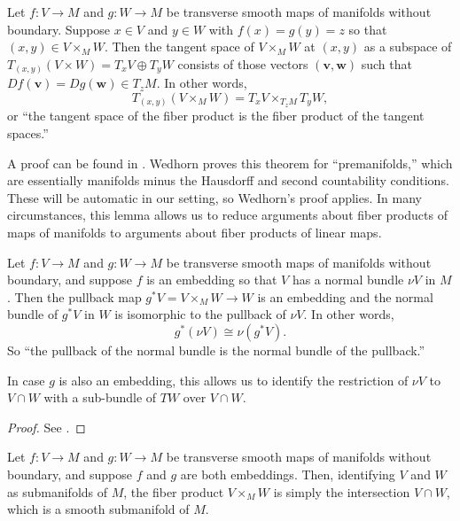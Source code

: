 \begin{remark}
\begin{lemma}\label{L: tangent of pullbacks}
	Let $f \colon V\to M$ and $g \colon W\to M$ be transverse smooth maps of manifolds without boundary.
	Suppose $x\in V$ and $y\in W$ with $f(x)=g(y)=z$ so that $(x,y)\in V\times_MW$.
	Then the tangent space of $V\times_MW$ at $(x,y)$ as a subspace of $T_{(x,y)}(V\times W)= T_xV\oplus T_yW$ consists of those vectors $(\mathbf v,\mathbf w)$ such that $Df(\mathbf v)=Dg(\mathbf w)\in T_zM$.
	In other words,
	$$T_{(x,y)}(V\times_MW)=T_xV\times_{T_zM}T_yW,$$
	or ``the tangent space of the fiber product is the fiber product of the tangent spaces.''
\end{lemma}

A proof can be found in \cite[Theorem 5.47]{Wed16}.
Wedhorn proves this theorem for ``premanifolds,'' which are essentially manifolds minus the Hausdorff and second countability conditions.
These will be automatic in our setting, so Wedhorn's proof applies.
In many circumstances, this lemma allows us to reduce arguments about fiber products of maps of manifolds to arguments about fiber products of linear maps.

\begin{lemma}\label{L: normal pullback}
	Let $f \colon V\to M$ and $g \colon W\to M$ be transverse smooth maps of manifolds without boundary, and suppose $f$ is an embedding so that $V$ has a normal bundle $\nu V$ in $M$.
	Then the pullback map $g^*V=V\times_MW\to W$ is an embedding and the normal bundle of $g^*V$ in $W$ is isomorphic to the pullback of $\nu V$.
	In other words,
	$$g^*(\nu V)\cong \nu(g^*V).$$
	So ``the pullback of the normal bundle is the normal bundle of the pullback.''

	In case $g$ is also an embedding, this allows us to identify the restriction of $\nu V$ to $V\cap W$ with a sub-bundle of $TW$ over $V\cap W$.
\end{lemma}

\begin{proof}
	See \cite[Proposition IV.1.4]{Kos93}.
\end{proof}

\begin{lemma}
	Let $f \colon V\to M$ and $g \colon W\to M$ be transverse smooth maps of manifolds without boundary, and suppose $f$ and $g$ are both embeddings.
	Then, identifying $V$ and $W$ as submanifolds of $M$, the fiber product $V\times_MW$ is simply the intersection $V\cap W$, which is a smooth submanifold of $M$.
\end{lemma}


\end{remark}
